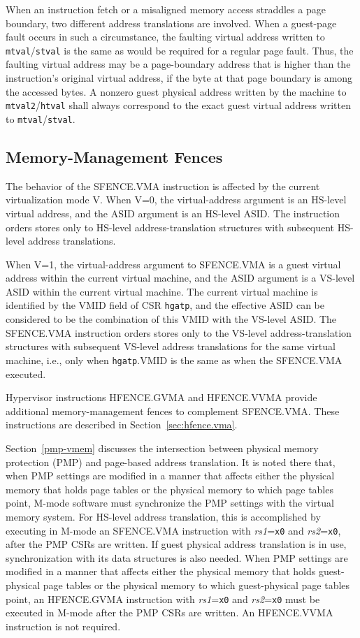 When an instruction fetch or a misaligned memory access straddles a page
boundary, two different address translations are involved.
When a guest-page fault occurs in such a circumstance, the faulting
virtual address written to {\tt mtval}/{\tt stval} is the same as would
be required for a regular page fault.
Thus, the faulting virtual address may be a page-boundary address that is
higher than the instruction's original virtual address, if the byte at
that page boundary is among the accessed bytes.
A nonzero guest physical address written by the machine to
{\tt mtval2}/{\tt htval}
shall always correspond to the exact guest virtual address written to
{\tt mtval}/{\tt stval}.

\subsection{Memory-Management Fences}

The behavior of the SFENCE.VMA instruction is affected by the current
virtualization mode V.  When V=0, the virtual-address argument is an HS-level
virtual address, and the ASID argument is an HS-level ASID.
The instruction orders stores only to HS-level address-translation structures
with subsequent HS-level address translations.

When V=1, the virtual-address argument to SFENCE.VMA is a guest virtual
address within the current virtual machine, and the ASID argument is a VS-level
ASID within the current virtual machine.
The current virtual machine is identified by the VMID field of CSR {\tt hgatp},
and the effective ASID can be considered to be the combination of this VMID
with the VS-level ASID.
The SFENCE.VMA instruction orders stores only to the VS-level
address-translation structures with subsequent VS-level address translations
for the same virtual machine, i.e., only when {\tt hgatp}.VMID is the same as
when the SFENCE.VMA executed.

Hypervisor instructions HFENCE.GVMA and HFENCE.VVMA provide additional
memory-management fences to complement SFENCE.VMA.
These instructions are described in Section~\ref{sec:hfence.vma}.

Section~\ref{pmp-vmem} discusses the intersection between physical memory
protection (PMP) and page-based address translation.
It is noted there that, when PMP settings are modified in a manner that affects
either the physical memory that holds page tables or the physical memory to
which page tables point, M-mode software must synchronize the PMP settings with
the virtual memory system.
For HS-level address translation, this is accomplished by executing in M-mode
an SFENCE.VMA instruction with {\em rs1}={\tt x0} and {\em rs2}={\tt x0}, after
the PMP CSRs are written.
If guest physical address translation is in use, synchronization with its data
structures is also needed.
When PMP settings are modified in a manner that affects either the physical
memory that holds guest-physical page tables or the physical memory to which
guest-physical page tables point, an HFENCE.GVMA instruction with
{\em rs1}={\tt x0} and {\em rs2}={\tt x0} must be executed in M-mode after the
PMP CSRs are written.
An HFENCE.VVMA instruction is not required.

